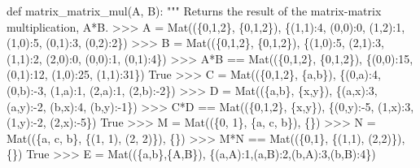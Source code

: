 \documentclass[
  letterpaper,
  DIV=11,
  numbers=noendperiod]{scrartcl}
\newenvironment{Shaded}{\begin{snugshade}}{\end{snugshade}}
\newcommand{\CommentTok}[1]{\textcolor[rgb]{0.37,0.37,0.37}{#1}}
\newcommand{\KeywordTok}[1]{\textcolor[rgb]{0.00,0.23,0.31}{#1}}
\newcommand{\NormalTok}[1]{\textcolor[rgb]{0.00,0.23,0.31}{#1}}
\begin{document}
\begin{Shaded}
\begin{Highlighting}[numbers=left,,]
\KeywordTok{def}\NormalTok{ matrix\_matrix\_mul(A, B):}
    \CommentTok{"""}
\CommentTok{    Returns the result of the matrix{-}matrix multiplication, A*B.}
\CommentTok{    \textgreater{}\textgreater{}\textgreater{} A = Mat((\{0,1,2\}, \{0,1,2\}), \{(1,1):4, (0,0):0, (1,2):1, (1,0):5, (0,1):3, (0,2):2\})}
\CommentTok{    \textgreater{}\textgreater{}\textgreater{} B = Mat((\{0,1,2\}, \{0,1,2\}), \{(1,0):5, (2,1):3, (1,1):2, (2,0):0, (0,0):1, (0,1):4\})}
\CommentTok{    \textgreater{}\textgreater{}\textgreater{} A*B == Mat((\{0,1,2\}, \{0,1,2\}), \{(0,0):15, (0,1):12, (1,0):25, (1,1):31\})}
\CommentTok{    True}
\CommentTok{    \textgreater{}\textgreater{}\textgreater{} C = Mat((\{0,1,2\}, \{\textquotesingle{}a\textquotesingle{},\textquotesingle{}b\textquotesingle{}\}), \{(0,\textquotesingle{}a\textquotesingle{}):4, (0,\textquotesingle{}b\textquotesingle{}):{-}3, (1,\textquotesingle{}a\textquotesingle{}):1, (2,\textquotesingle{}a\textquotesingle{}):1, (2,\textquotesingle{}b\textquotesingle{}):{-}2\})}
\CommentTok{    \textgreater{}\textgreater{}\textgreater{} D = Mat((\{\textquotesingle{}a\textquotesingle{},\textquotesingle{}b\textquotesingle{}\}, \{\textquotesingle{}x\textquotesingle{},\textquotesingle{}y\textquotesingle{}\}), \{(\textquotesingle{}a\textquotesingle{},\textquotesingle{}x\textquotesingle{}):3, (\textquotesingle{}a\textquotesingle{},\textquotesingle{}y\textquotesingle{}):{-}2, (\textquotesingle{}b\textquotesingle{},\textquotesingle{}x\textquotesingle{}):4, (\textquotesingle{}b\textquotesingle{},\textquotesingle{}y\textquotesingle{}):{-}1\})}
\CommentTok{    \textgreater{}\textgreater{}\textgreater{} C*D == Mat((\{0,1,2\}, \{\textquotesingle{}x\textquotesingle{},\textquotesingle{}y\textquotesingle{}\}), \{(0,\textquotesingle{}y\textquotesingle{}):{-}5, (1,\textquotesingle{}x\textquotesingle{}):3, (1,\textquotesingle{}y\textquotesingle{}):{-}2, (2,\textquotesingle{}x\textquotesingle{}):{-}5\})}
\CommentTok{    True}
\CommentTok{    \textgreater{}\textgreater{}\textgreater{} M = Mat((\{0, 1\}, \{\textquotesingle{}a\textquotesingle{}, \textquotesingle{}c\textquotesingle{}, \textquotesingle{}b\textquotesingle{}\}), \{\})}
\CommentTok{    \textgreater{}\textgreater{}\textgreater{} N = Mat((\{\textquotesingle{}a\textquotesingle{}, \textquotesingle{}c\textquotesingle{}, \textquotesingle{}b\textquotesingle{}\}, \{(1, 1), (2, 2)\}), \{\})}
\CommentTok{    \textgreater{}\textgreater{}\textgreater{} M*N == Mat((\{0,1\}, \{(1,1), (2,2)\}), \{\})}
\CommentTok{    True}
\CommentTok{    \textgreater{}\textgreater{}\textgreater{} E = Mat((\{\textquotesingle{}a\textquotesingle{},\textquotesingle{}b\textquotesingle{}\},\{\textquotesingle{}A\textquotesingle{},\textquotesingle{}B\textquotesingle{}\}), \{(\textquotesingle{}a\textquotesingle{},\textquotesingle{}A\textquotesingle{}):1,(\textquotesingle{}a\textquotesingle{},\textquotesingle{}B\textquotesingle{}):2,(\textquotesingle{}b\textquotesingle{},\textquotesingle{}A\textquotesingle{}):3,(\textquotesingle{}b\textquotesingle{},\textquotesingle{}B\textquotesingle{}):4\})}

\end{Highlighting}
\end{Shaded}
\end{document}
